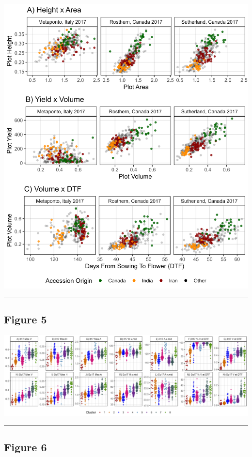\documentclass[
]{article}
\begin{document}
\includegraphics{Figure_04.png}

\begin{center}\rule{0.5\linewidth}{0.5pt}\end{center}

\subsection{Figure 5}\label{figure-5}

\includegraphics{Figure_05.png}

\begin{center}\rule{0.5\linewidth}{0.5pt}\end{center}

\subsection{Figure 6}\label{figure-6}
\end{document}
